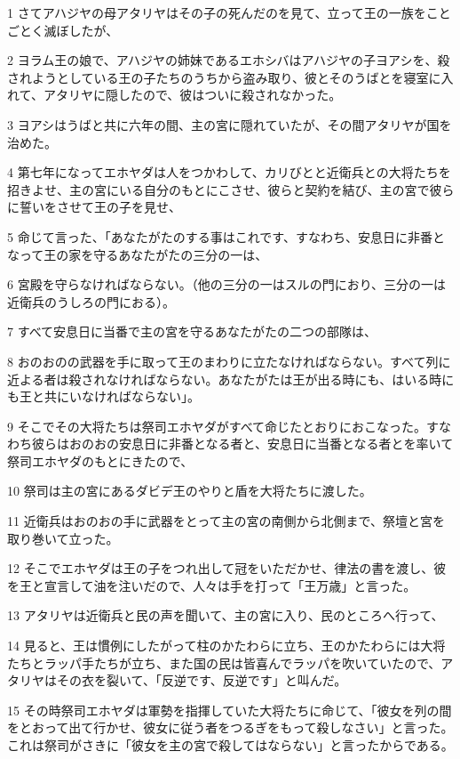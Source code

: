 \par 1 さてアハジヤの母アタリヤはその子の死んだのを見て、立って王の一族をことごとく滅ぼしたが、
\par 2 ヨラム王の娘で、アハジヤの姉妹であるエホシバはアハジヤの子ヨアシを、殺されようとしている王の子たちのうちから盗み取り、彼とそのうばとを寝室に入れて、アタリヤに隠したので、彼はついに殺されなかった。
\par 3 ヨアシはうばと共に六年の間、主の宮に隠れていたが、その間アタリヤが国を治めた。
\par 4 第七年になってエホヤダは人をつかわして、カリびとと近衛兵との大将たちを招きよせ、主の宮にいる自分のもとにこさせ、彼らと契約を結び、主の宮で彼らに誓いをさせて王の子を見せ、
\par 5 命じて言った、「あなたがたのする事はこれです、すなわち、安息日に非番となって王の家を守るあなたがたの三分の一は、
\par 6 宮殿を守らなければならない。（他の三分の一はスルの門におり、三分の一は近衛兵のうしろの門におる）。
\par 7 すべて安息日に当番で主の宮を守るあなたがたの二つの部隊は、
\par 8 おのおのの武器を手に取って王のまわりに立たなければならない。すべて列に近よる者は殺されなければならない。あなたがたは王が出る時にも、はいる時にも王と共にいなければならない」。
\par 9 そこでその大将たちは祭司エホヤダがすべて命じたとおりにおこなった。すなわち彼らはおのおの安息日に非番となる者と、安息日に当番となる者とを率いて祭司エホヤダのもとにきたので、
\par 10 祭司は主の宮にあるダビデ王のやりと盾を大将たちに渡した。
\par 11 近衛兵はおのおの手に武器をとって主の宮の南側から北側まで、祭壇と宮を取り巻いて立った。
\par 12 そこでエホヤダは王の子をつれ出して冠をいただかせ、律法の書を渡し、彼を王と宣言して油を注いだので、人々は手を打って「王万歳」と言った。
\par 13 アタリヤは近衛兵と民の声を聞いて、主の宮に入り、民のところへ行って、
\par 14 見ると、王は慣例にしたがって柱のかたわらに立ち、王のかたわらには大将たちとラッパ手たちが立ち、また国の民は皆喜んでラッパを吹いていたので、アタリヤはその衣を裂いて、「反逆です、反逆です」と叫んだ。
\par 15 その時祭司エホヤダは軍勢を指揮していた大将たちに命じて、「彼女を列の間をとおって出て行かせ、彼女に従う者をつるぎをもって殺しなさい」と言った。これは祭司がさきに「彼女を主の宮で殺してはならない」と言ったからである。
